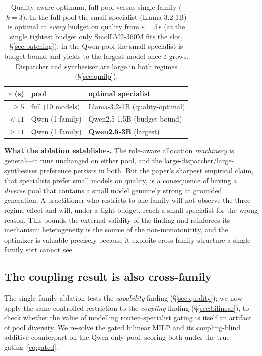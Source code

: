 \documentclass[11pt]{article}
\newcommand{\eps}{\varepsilon}
\begin{document}
\begin{table}[H]
\centering
\caption{Quality-aware optimum, full pool versus single family ($k{=}3$). In the
full pool the small specialist (Llama-3.2-1B) is optimal at \emph{every} budget on
quality from $\eps{=}5$\,s (at the single tightest budget only SmolLM2-360M fits the
slot, §\ref{sec:batching}); in the Qwen pool the small specialist is budget-bound and yields to the
largest model once $\eps$ grows. Dispatcher and synthesiser are large in both
regimes (§\ref{sec:qmilp}).}
\label{tab:poolcontrast}
\begin{tabular}{rll}
\toprule
$\eps$ (s) & pool & optimal specialist \\
\midrule
$\ge5$ & full (10 models) & Llama-3.2-1B (quality-optimal) \\
$<11$    & Qwen (1 family)  & Qwen2.5-1.5B (budget-bound) \\
$\ge 11$    & Qwen (1 family)  & \textbf{Qwen2.5-3B} (largest) \\
\bottomrule
\end{tabular}
\end{table}

\textbf{What the ablation establishes.} The role-aware allocation \emph{machinery}
is general---it runs unchanged on either pool, and the
large-dispatcher/large-synthesiser preference persists in both. But the paper's
sharpest empirical claim, that specialists prefer small models on quality, is a
consequence of having a \emph{diverse} pool that contains a small model genuinely
strong at grounded generation. A practitioner who restricts to one family will not
observe the three-regime effect and will, under a tight budget, reach a small
specialist for the wrong reason. This bounds the external validity of the finding
and reinforces its mechanism: heterogeneity is the source of the non-monotonicity,
and the optimizer is valuable precisely because it exploits cross-family structure
a single-family sort cannot see.

\subsection{The coupling result is also cross-family}
\label{sec:coupling-family}
The single-family ablation tests the \emph{capability} finding (§\ref{sec:quality});
we now apply the same controlled restriction to the \emph{coupling} finding
(§\ref{sec:bilinear}), to check whether the value of modelling router--specialist
gating is itself an artifact of pool diversity. We re-solve the gated bilinear MILP
and its coupling-blind additive counterpart on the Qwen-only pool, scoring both
under the true gating~\eqref{eq:gated}.
\end{document}
